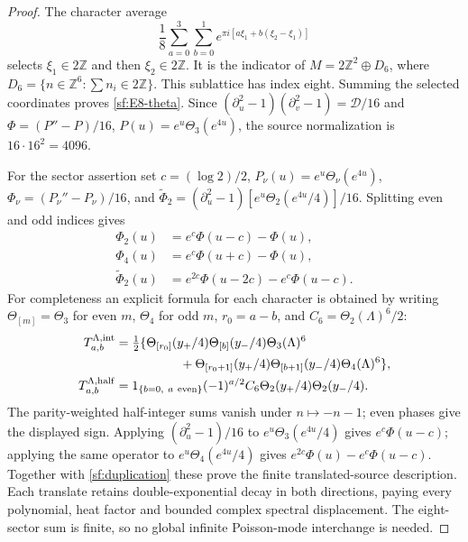 \documentclass[11pt]{article}
\numberwithin{equation}{section}
\theoremstyle{definition}
\theoremstyle{remark}
\begin{document}
\begin{proof}
The character average
\[
 \frac18\sum_{a=0}^3\sum_{b=0}^1
        e^{\pi i[a\xi_1+b(\xi_2-\xi_1)]}
\]
selects \(\xi_1\in2\mathbb Z\) and then \(\xi_2\in2\mathbb Z\).
It is the indicator of
\(M=2\mathbb Z^2\oplus D_6\), where
\(D_6=\{n\in\mathbb Z^6:\sum n_i\in2\mathbb Z\}\).
This sublattice has index eight.  Summing the selected coordinates
proves \eqref{sf:E8-theta}.  Since
\((\partial_u^2-1)(\partial_v^2-1)=\mathcal D/16\) and
\(\Phi=(P''-P)/16\), \(P(u)=e^u\Theta_3(e^{4u})\), the source
normalization is \(16\cdot16^2=4096\).

For the sector assertion set \(c=(\log2)/2\),
\(P_\nu(u)=e^u\Theta_\nu(e^{4u})\),
\(\Phi_\nu=(P_\nu''-P_\nu)/16\), and
\(\widetilde\Phi_2=(\partial_u^2-1)
[e^u\Theta_2(e^{4u}/4)]/16\).  Splitting even and odd indices gives
\begin{equation}
 \begin{split}
 \Phi_2(u)&=e^c\Phi(u-c)-\Phi(u),\\
 \Phi_4(u)&=e^c\Phi(u+c)-\Phi(u),\\
 \widetilde\Phi_2(u)&=e^{2c}\Phi(u-2c)-e^c\Phi(u-c).
 \end{split}
 \label{sf:duplication}
\end{equation}
For completeness an explicit formula for each character is obtained
by writing \(\Theta_{[m]}=\Theta_3\) for even \(m\), \(\Theta_4\)
for odd \(m\), \(r_0=a-b\), and \(C_6=\Theta_2(\Lambda)^6/2\):
\begin{align*}
 T_{a,b}^{\Lambda,\mathrm{int}}
 &=\tfrac12\{
 \Theta_{[r_0]}(y_+/4)\Theta_{[b]}(y_-/4)\Theta_3(\Lambda)^6\\
 &\hspace{18mm}+
 \Theta_{[r_0+1]}(y_+/4)\Theta_{[b+1]}(y_-/4)
                                      \Theta_4(\Lambda)^6\},\\
 T_{a,b}^{\Lambda,\mathrm{half}}
 &=1_{\{b=0,\ a\ {\rm even}\}}(-1)^{a/2}
                     C_6\Theta_2(y_+/4)\Theta_2(y_-/4).
\end{align*}
The parity-weighted half-integer sums vanish under \(n\mapsto-n-1\);
even phases give the displayed sign.  Applying \((\partial_u^2-1)/16\) to
\(e^u\Theta_3(e^{4u}/4)\) gives \(e^c\Phi(u-c)\); applying the
same operator to \(e^u\Theta_4(e^{4u}/4)\) gives
\(e^{2c}\Phi(u)-e^c\Phi(u-c)\).  Together with
\eqref{sf:duplication} these prove the finite translated-source
description.  Each translate retains double-exponential decay in
both directions, paying every polynomial, heat factor and bounded
complex spectral displacement.  The eight-sector sum is finite,
so no global infinite Poisson-mode interchange is needed.
\end{proof}
\end{document}

